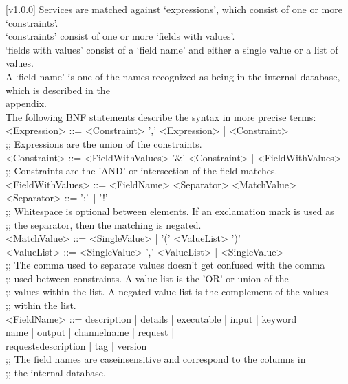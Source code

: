 [v1.0.0]
%
Services are matched against `expressions', which consist of one or more
`constraints'.\\
`constraints' consist of one or more `fields with values'.\\
`fields with values' consist of a `field name' and either a single value or a list of
values.\\
A `field name' is one of the names recognized as being in the internal database, which is
described in the\\
 appendix.\\

The following BNF statements describe the syntax in more precise terms:
\outputBegin{}
<Expression> ::= <Constraint> ',' <Expression> | <Constraint>\\
;; Expressions are the union of the constraints.\\

<Constraint> ::= <FieldWithValues> '\&' <Constraint> | <FieldWithValues>\\
;; Constraints are the 'AND' or intersection of the field matches.\\

<FieldWithValues> ::= <FieldName> <Separator> <MatchValue>\\
<Separator> ::= ':'\ | '!'\\
;; Whitespace is optional between elements. If an exclamation mark is used as\\
;; the separator, then the matching is negated.\\

<MatchValue> ::= <SingleValue> | '(' <ValueList> ')'\\
<ValueList> ::= <SingleValue> ',' <ValueList> | <SingleValue>\\
;; The comma used to separate values doesn't get confused with the comma\\
;; used between constraints. A value list is the 'OR' or union of the\\
;; values within the list. A negated value list is the complement of the values\\
;; within the list.\\

\settowidth{\uL}{<FieldName> ::= }%
<FieldName> ::= description | details | executable | input | keyword |\\
\hspace*{\uL}name | output | channelname | request |\\
\hspace*{\uL}requestsdescription | tag | version\\
;; The field names are case\longDash{}insensitive and correspond to the columns in\\
;; the internal database.\\

